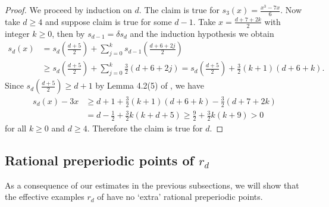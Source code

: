 \documentclass[12pt]{amsart}
\theoremstyle{definition}
\begin{document}
\begin{proof}
    We proceed by induction on $d$. The claim is true for $s_3(x) = \frac{x^3-7x}{6}$. Now take $d\geq 4$ and suppose claim is true for some $d-1$. Take $x=\frac{d+7+2k}{2}$ with integer $k\geq 0$, then by $s_{d-1} = \delta s_d$ and the induction hypothesis we obtain
    \begin{align*}
        s_{d}(x) 
        &= s_{d}\left(\frac{d+5}{2}\right) + \sum_{j=0}^{k}s_{d-1}\left(\frac{d+6+2j}{2}\right) \\
        &
        \geq s_{d}\left(\frac{d+5}{2}\right) + \sum_{j=0}^{k}\frac{3}{2}(d+6+2j) 
        = s_{d}\left(\frac{d+5}{2}\right) + \frac{3}{2}(k+1)(d+6+k).
    \end{align*}
    Since $s_d(\frac{d+5}{2})\geq d+1$ by Lemma 4.2(5) of \cite{doyle2022polynomialsrationalpreperiodicpoints}, we have
    \begin{align*}
        s_d(x) - 3x &\geq d+1 + \frac{3}{2}(k+1)(d+6+k) - \frac{3}{2}(d+7+2k) \\
        & = d-\frac{1}{2}+\frac{3}{2}k(k+d+5) \geq \frac{9}{2} + \frac{3}{2}k(k+9) > 0
    \end{align*}
    for all $k\geq 0$ and $d\geq 4$. Therefore the claim is true for $d$.
\end{proof}

\subsection{Rational preperiodic points of $r_d$} \label{subsection:ratl_preper_rd}

As a consequence of our estimates in the previous subsections, we will show that the effective examples $r_d$ of \cite{doyle2022polynomialsrationalpreperiodicpoints} have no `extra' rational preperiodic points.
\end{document}
